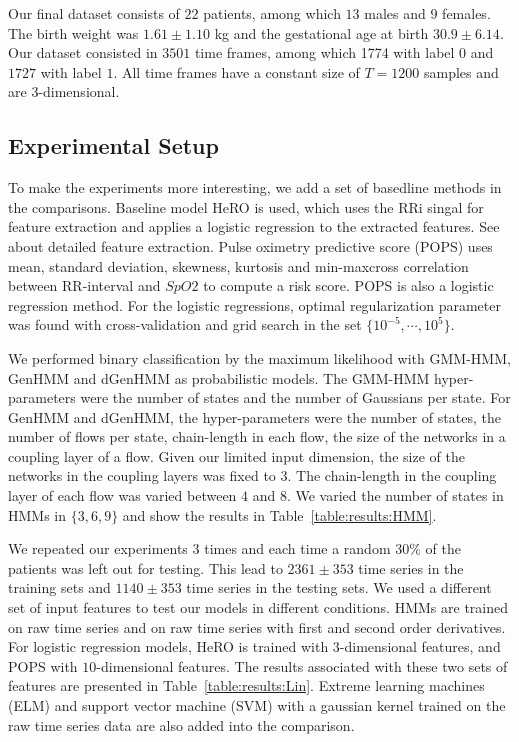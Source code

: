 Our final dataset consists of $22$ patients, among which $13$ males and $9$ females.
The birth weight was $1.61\pm1.10$ kg and the gestational age at birth $30.9\pm6.14$.
Our dataset consisted in $3501$ time frames, among which 1774 with label $0$ and $1727$ with label $1$.
All time frames have a constant size of $T=1200$ samples and are $3$-dimensional.

\subsection{Experimental Setup}
To make the experiments more interesting, we add a set of basedline methods in the comparisons.
Baseline model HeRO is used, which uses the RRi singal for feature extraction and applies a logistic regression to the extracted features. See \cite{honore2020icassp} about detailed feature extraction.
Pulse oximetry predictive score (POPS) \cite{sullivanEarlyPulseOximetry2018} uses mean, standard  deviation,  skewness,  kurtosis  and  min-maxcross correlation between RR-interval and $SpO2$ to compute a risk score. POPS is also a logistic regression method. 
For the logistic regressions, optimal regularization parameter was found with cross-validation and grid search in the set $\{10^{-5}, \cdots, 10^{5}\}$.

We performed binary classification by the maximum likelihood with GMM-HMM, GenHMM and dGenHMM as probabilistic models.
The GMM-HMM hyper-parameters were the number of states and the number of Gaussians per state.
For GenHMM and dGenHMM, the hyper-parameters were the number of states, the number of flows per state, chain-length in each flow, the size of the networks in a coupling layer of a flow.
Given our limited input dimension, the size of the networks in the coupling layers was fixed to $3$.
The chain-length in the coupling layer of each flow was varied between $4$ and $8$.
We varied the number of states in HMMs in $\{3,6,9\}$ and show the results in Table~\ref{table:results:HMM}.

We repeated our experiments $3$ times and each time a random $30\%$ of the patients was left out for testing.
This lead to $2361 \pm 353$ time series in the training sets and $1140 \pm 353$ time series in the testing sets.
We used a different set of input features to test our models in different conditions.
HMMs are trained on raw time series and on raw time series with first and second order derivatives.
For logistic regression models, HeRO is trained with $3$-dimensional features, and POPS with $10$-dimensional features.
The results associated with these two sets of features are presented in Table~\ref{table:results:Lin}.
Extreme learning machines (ELM) and support vector machine (SVM) with a gaussian kernel trained on the raw time series data are also added into the comparison.

